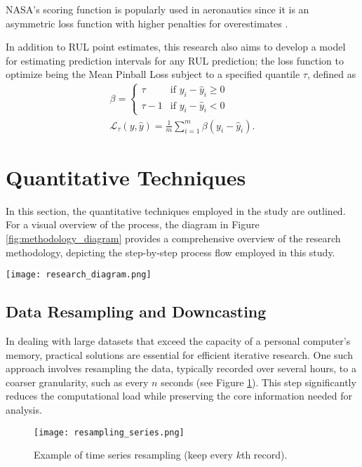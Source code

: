 \documentclass{IEEEtran}
\begin{document}
            NASA's scoring function is popularly used in aeronautics since it is an asymmetric loss function with higher penalties for overestimates \cite{saxena2008damage}.

            In addition to RUL point estimates, this research also aims to develop a model for estimating prediction intervals for any RUL prediction; the loss function to optimize being the Mean Pinball Loss subject to a specified quantile $\tau$, defined as
            \begin{equation}\label{eqn:pinball}
                \begin{gathered}
                    \beta = \begin{cases}
                        \tau & \text{if } y_i - \hat{y}_i \geq 0 \\
                        \tau - 1 & \text{if } y_i - \hat{y}_i < 0
                    \end{cases}  \\
                    \mathcal{L}_\tau(y, \hat{y}) = \frac{1}{m} \sum_{i=1}^{m} \beta (y_i - \hat{y}_i).
                \end{gathered}
            \end{equation}

    \section{Quantitative Techniques} \label{sec:methodology}

        In this section, the quantitative techniques employed in the study are outlined. For a visual overview of the process, the diagram in Figure \ref{fig:methodology_diagram} provides a comprehensive overview of the research methodology, depicting the step-by-step process flow employed in this study.
        \begin{figure*}[!htbp]
            \centering
            \texttt{[image: research\_diagram.png]}
            \caption{Proposed methodology overview.}
            \label{fig:methodology_diagram}
        \end{figure*}

        \subsection{Data Resampling and Downcasting} \label{sec:resampling}

            In dealing with large datasets that exceed the capacity of a personal computer's memory, practical solutions are essential for efficient iterative research. One such approach involves resampling the data, typically recorded over several hours, to a coarser granularity, such as every $n$ seconds (see Figure \ref{fig:resampling}). This step significantly reduces the computational load while preserving the core information needed for analysis.
            \begin{figure}[!htbp]
                \centering
                \texttt{[image: resampling\_series.png]}
                \caption{Example of time series resampling (keep every $k$th record).}
                \label{fig:resampling}
            \end{figure}
\end{document}

